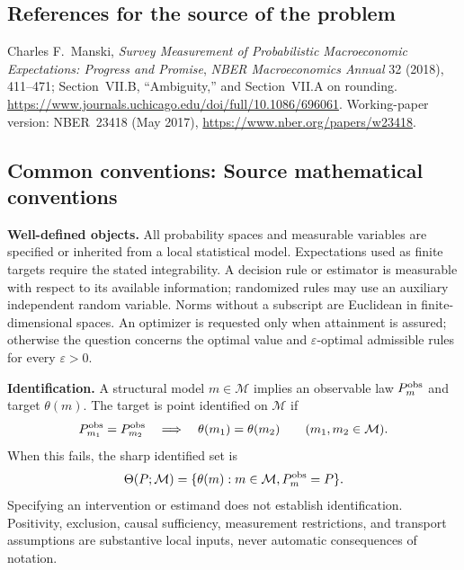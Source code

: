 \documentclass[11pt,a4paper]{article}
\begin{document}
\subsection*{References for the source of the problem}
Charles F.~Manski, \emph{Survey Measurement of Probabilistic Macroeconomic Expectations: Progress and Promise}, \emph{NBER Macroeconomics Annual} 32 (2018), 411--471; Section~VII.B, ``Ambiguity,'' and Section~VII.A on rounding. \url{https://www.journals.uchicago.edu/doi/full/10.1086/696061}. Working-paper version: NBER~23418 (May 2017), \url{https://www.nber.org/papers/w23418}.

\subsection*{Common conventions: Source mathematical conventions}

\textbf{Well-defined objects.}
All probability spaces and measurable variables are specified or inherited
from a local statistical model. Expectations used as finite targets require
the stated integrability. A decision rule or estimator is measurable with
respect to its available information; randomized rules may use an auxiliary
independent random variable. Norms without a subscript are Euclidean in
finite-dimensional spaces. An optimizer is requested only when attainment
is assured; otherwise the question concerns the optimal value and
$\varepsilon$-optimal admissible rules for every $\varepsilon>0$.

\textbf{Identification.}
A structural model $m\in\mathcal M$ implies an observable law
$P_m^{\rm obs}$ and target $\theta(m)$. The target is point identified on
$\mathcal M$ if
\[
 P_{m_1}^{\rm obs}=P_{m_2}^{\rm obs}
 \quad\Longrightarrow\quad\theta(m_1)=\theta(m_2)
 \qquad(m_1,m_2\in\mathcal M).
\]
When this fails, the sharp identified set is
\[
 \Theta(P;\mathcal M)=\{\theta(m):m\in\mathcal M,
                                  P_m^{\rm obs}=P\}.
\]
Specifying an intervention or estimand does not establish identification.
Positivity, exclusion, causal sufficiency, measurement restrictions, and
transport assumptions are substantive local inputs, never automatic
consequences of notation.
\end{document}
